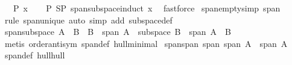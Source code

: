 \begin{isabellebody}
\ \ \ {\isachardoublequoteopen}P\ x{\isachardoublequoteclose}\isanewline
%
\isadelimproof
\ \ %
\endisadelimproof
%
\isatagproof
{}\isamarkupfalse%
\ P\ SP\ span{\isacharunderscore}{\kern0pt}subspace{\isacharunderscore}{\kern0pt}induct\ x\ \isamarkupfalse%
\ fastforce%
\endisatagproof
{\isafoldproof}%
%
\isadelimproof
\isanewline
%
\endisadelimproof
\isanewline
{}\isamarkupfalse%
\ span{\isacharunderscore}{\kern0pt}empty{\isacharbrackleft}{\kern0pt}simp{\isacharbrackright}{\kern0pt}{\isacharcolon}{\kern0pt}\ {\isachardoublequoteopen}span\ {\isacharbraceleft}{\kern0pt}{\isacharbraceright}{\kern0pt}\ {\isacharequal}{\kern0pt}\ {\isacharbraceleft}{\kern0pt}{}{\isacharbraceright}{\kern0pt}{\isachardoublequoteclose}\isanewline
%
\isadelimproof
\ \ %
\endisadelimproof
%
\isatagproof
{}\isamarkupfalse%
\ {\isacharparenleft}{\kern0pt}rule\ span{\isacharunderscore}{\kern0pt}unique{\isacharparenright}{\kern0pt}\ {\isacharparenleft}{\kern0pt}auto\ simp\ add{\isacharcolon}{\kern0pt}\ subspace{\isacharunderscore}{\kern0pt}def{\isacharparenright}{\kern0pt}%
\endisatagproof
{\isafoldproof}%
%
\isadelimproof
\isanewline
%
\endisadelimproof
\isanewline
{}\isamarkupfalse%
\ span{\isacharunderscore}{\kern0pt}subspace{\isacharcolon}{\kern0pt}\ {\isachardoublequoteopen}A\ {\isasymsubseteq}\ B\ {\isasymLongrightarrow}\ B\ {\isasymsubseteq}\ span\ A\ {\isasymLongrightarrow}\ subspace\ B\ {\isasymLongrightarrow}\ span\ A\ {\isacharequal}{\kern0pt}\ B{\isachardoublequoteclose}\isanewline
%
\isadelimproof
\ \ %
\endisadelimproof
%
\isatagproof
{}\isamarkupfalse%
\ {\isacharparenleft}{\kern0pt}metis\ order{\isacharunderscore}{\kern0pt}antisym\ span{\isacharunderscore}{\kern0pt}def\ hull{\isacharunderscore}{\kern0pt}minimal{\isacharparenright}{\kern0pt}%
\endisatagproof
{\isafoldproof}%
%
\isadelimproof
\isanewline
%
\endisadelimproof
\isanewline
{}\isamarkupfalse%
\ span{\isacharunderscore}{\kern0pt}span{\isacharcolon}{\kern0pt}\ {\isachardoublequoteopen}span\ {\isacharparenleft}{\kern0pt}span\ A{\isacharparenright}{\kern0pt}\ {\isacharequal}{\kern0pt}\ span\ A{\isachardoublequoteclose}\isanewline
%
\isadelimproof
\ \ %
\endisadelimproof
%
\isatagproof
{}\isamarkupfalse%
\ span{\isacharunderscore}{\kern0pt}def\ hull{\isacharunderscore}{\kern0pt}hull\ \isacommand{{\isachardot}{\kern0pt}{\isachardot}{\kern0pt}}\isamarkupfalse%
%
\endisatagproof
{\isafoldproof}%
%
\isadelimproof
\isanewline
%
\endisadelimproof
\isanewline
\isanewline

\end{isabellebody}
